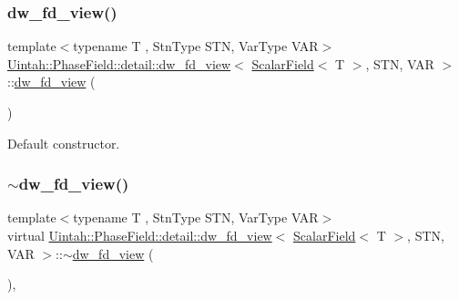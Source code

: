 \subsubsection{\texorpdfstring{dw\+\_\+fd\+\_\+view()}{dw\_fd\_view()}\hspace{0.1cm}{\footnotesize\ttfamily [1/2]}}
{\footnotesize\ttfamily template$<$typename T , Stn\+Type S\+TN, Var\+Type V\+AR$>$ \\
\hyperlink{classUintah_1_1PhaseField_1_1detail_1_1dw__fd__view}{Uintah\+::\+Phase\+Field\+::detail\+::dw\+\_\+fd\+\_\+view}$<$ \hyperlink{structUintah_1_1PhaseField_1_1ScalarField}{Scalar\+Field}$<$ T $>$, S\+TN, V\+AR $>$\+::\hyperlink{classUintah_1_1PhaseField_1_1detail_1_1dw__fd__view}{dw\+\_\+fd\+\_\+view} (\begin{DoxyParamCaption}{ }\end{DoxyParamCaption})\hspace{0.3cm}{\ttfamily [default]}}



Default constructor. 

\mbox{\label{classUintah_1_1PhaseField_1_1detail_1_1dw__fd__view_3_01ScalarField_3_01T_01_4_00_01STN_00_01VAR_01_4_a60f52e459d40794dd546c478b62263c3}} 
\subsubsection{\texorpdfstring{$\sim$dw\+\_\+fd\+\_\+view()}{~dw\_fd\_view()}}
{\footnotesize\ttfamily template$<$typename T , Stn\+Type S\+TN, Var\+Type V\+AR$>$ \\
virtual \hyperlink{classUintah_1_1PhaseField_1_1detail_1_1dw__fd__view}{Uintah\+::\+Phase\+Field\+::detail\+::dw\+\_\+fd\+\_\+view}$<$ \hyperlink{structUintah_1_1PhaseField_1_1ScalarField}{Scalar\+Field}$<$ T $>$, S\+TN, V\+AR $>$\+::$\sim$\hyperlink{classUintah_1_1PhaseField_1_1detail_1_1dw__fd__view}{dw\+\_\+fd\+\_\+view} (\begin{DoxyParamCaption}{ }\end{DoxyParamCaption})\hspace{0.3cm}{\ttfamily [virtual]}, {\ttfamily [default]}}



